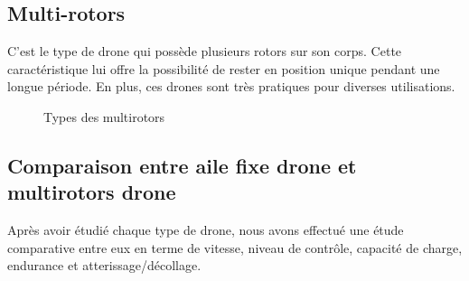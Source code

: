	\subsection{Multi-rotors}
	C'est le type de drone qui possède plusieurs rotors sur son corps. Cette caractéristique lui offre la possibilité de rester en position unique pendant une longue période. En plus, ces drones sont très pratiques pour diverses utilisations.
	\begin {figure}[h] 
	\begin{center} 
		\centering
		
	\end{center}
	
	\caption{Types des multirotors}
	\end{figure}
	
	
	
	
	
	
	
	\subsection{Comparaison entre aile fixe drone et multirotors drone}
	Après avoir étudié chaque type de drone, nous avons effectué une étude comparative entre eux en terme de vitesse, niveau de contrôle, capacité de charge, endurance et atterissage/décollage.
	
